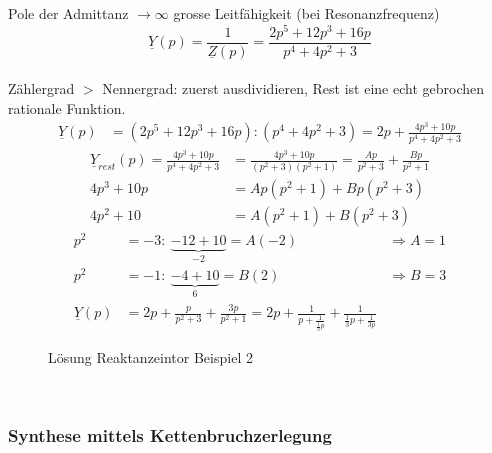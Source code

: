 Pole der Admittanz $\rightarrow \infty$ grosse Leitfähigkeit (bei
Resonanzfrequenz)\\
$$\underline{Y}(p)=\frac{1}{\underline{Z}(p)}=\frac{2p^5+12p^3+16p}{p^4+4p^2+3}$$\\
Zählergrad $>$ Nennergrad: zuerst ausdividieren, Rest ist eine echt gebrochen
rationale Funktion.
\begin{align}
\underline{Y}(p)&=(2p^5+12p^3+16p):(p^4+4p^2+3)=2p+\frac{4p^3+10p}{p^4+4p^2+3}\nonumber
\end{align}
\begin{align}
\underline{Y}_{rest}(p)=\frac{4p^3+10p}{p^4+4p^2+3}&=\frac{4p^3+10p}{(p^2+3)(p^2+1)}=\frac{Ap}{p^2+3}+\frac{Bp}{p^2+1}\nonumber\\
4p^3+10p&=Ap(p^2+1)+Bp(p^2+3)\nonumber\\
4p^2+10&=A(p^2+1)+B(p^2+3)\nonumber
\end{align}
\begin{align}
p^2&=-3:\ \underbrace{-12+10}_{-2}=A(-2) &\Rightarrow A=1\nonumber\\
p^2&=-1:\ \underbrace{-4+10}_{6}=B(2) &\Rightarrow B=3\nonumber\\
\underline{Y}(p)&=2p+\frac{p}{p^2+3}+\frac{3p}{p^2+1}=2p+\frac{1}{p+\frac{1}{\frac{1}{3}p}}+\frac{1}{\frac{1}{3}p+\frac{1}{3p}}\nonumber
\end{align}
\begin{figure}[!ht]
	\centering
	
	\caption{Lösung Reaktanzeintor Beispiel 2}
	\label{fig:RetSyntheseBsp2L}
\end{figure}\\


\subsubsection{Synthese mittels Kettenbruchzerlegung}
